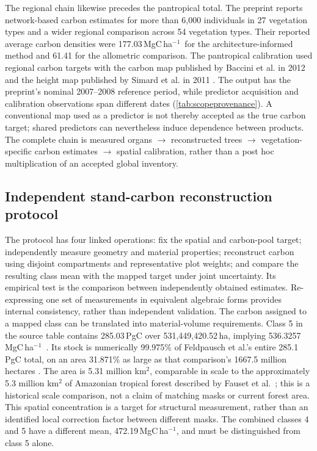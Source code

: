 \documentclass[11pt,a4paper]{article}
\theoremstyle{remark}
\begin{document}
The regional chain likewise precedes the pantropical total. The preprint reports network-based carbon estimates for more than 6,000 individuals in 27 vegetation types and a wider regional comparison across 54 vegetation types. Their reported average carbon densities were 177.03\,MgC\,ha$^{-1}$\ for the architecture-informed method and 61.41 for the allometric comparison. The pantropical calibration used regional carbon targets with the carbon map published by Baccini et al. in 2012 and the height map published by Simard et al. in 2011 \citep[pp.~22--24]{Arellano2016}. The output has the preprint's nominal 2007--2008 reference period, while predictor acquisition and calibration observations span different dates (\cref{tab:scopeprovenance}). A conventional map used as a predictor is not thereby accepted as the true carbon target; shared predictors can nevertheless induce dependence between products. The complete chain is measured organs $\rightarrow$ reconstructed trees $\rightarrow$ vegetation-specific carbon estimates $\rightarrow$ spatial calibration, rather than a post hoc multiplication of an accepted global inventory.


\subsection{Independent stand-carbon reconstruction protocol}\label{sec:physicalclosure}
The protocol has four linked operations: fix the spatial and carbon-pool target; independently measure geometry and material properties; reconstruct carbon using disjoint compartments and representative plot weights; and compare the resulting class mean with the mapped target under joint uncertainty. Its empirical test is the comparison between independently obtained estimates. Re-expressing one set of measurements in equivalent algebraic forms provides internal consistency, rather than independent validation.
The carbon assigned to a mapped class can be translated into material-volume requirements. Class 5 in the source table contains 285.03\,PgC over 531,449,420.52\,ha, implying 536.3257\,MgC\,ha$^{-1}$\ \citep[Table~3]{Arellano2016}. Its stock is numerically 99.975\% of Feldpausch et al.'s entire 285.1\,PgC total, on an area 31.871\% as large as that comparison's 1667.5 million hectares \citep{Feldpausch2012}. The area is 5.31 million km$^2$, comparable in scale to the approximately 5.3 million km$^2$ of Amazonian tropical forest described by Fauset et al.\ \citep{Fauset2015}; this is a historical scale comparison, not a claim of matching masks or current forest area. This spatial concentration is a target for structural measurement, rather than an identified local correction factor between different masks. The combined classes 4 and 5 have a different mean, 472.19\,MgC\,ha$^{-1}$, and must be distinguished from class 5 alone.
\end{document}
